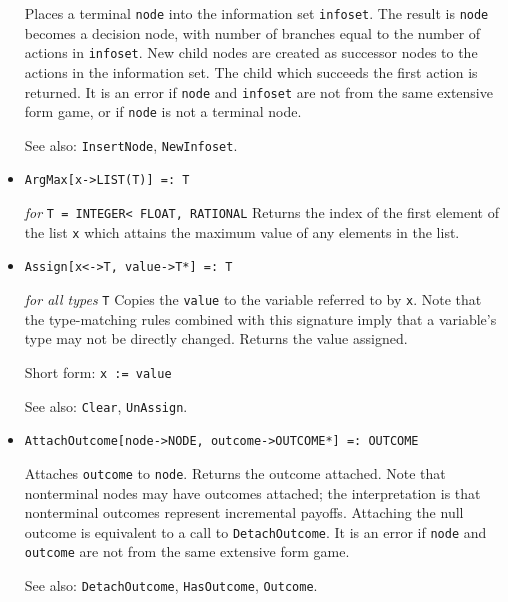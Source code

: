 \begin{itemize}
\bd
Places a terminal \verb+node+ into the information set
\verb+infoset+.  The result is \verb+node+ becomes a decision node,
with number of branches equal to the number of actions in \verb+infoset+.
New child nodes are created as successor nodes to the actions in the
information set.  The child which succeeds the first action is returned.
It is an error if \verb+node+ and \verb+infoset+ are not from the same
extensive form game, or if \verb+node+ is not a terminal node.

\item [See also:] \verb+InsertNode+, \verb+NewInfoset+.
\ed



\item 
\protect \large \begin{verbatim}
ArgMax[x->LIST(T)] =: T 
\end{verbatim} \normalsize

{\it for} {\tt T = INTEGER< FLOAT, RATIONAL} 
\bd 
Returns the index of the first element of the list \verb+x+ which
attains the maximum value of any elements in the list.  
\ed

\item 
\protect \large \begin{verbatim}
Assign[x<->T, value->T*] =: T
\end{verbatim} \normalsize

{\it for all types} {\tt T}
\bd
Copies the \verb+value+ to the variable referred to by \verb+x+.
Note that the type-matching rules combined with this signature imply that
a variable's type may not be directly changed.  Returns the value assigned.
\item [Short form:] \verb+x := value+
\item [See also:] \verb+Clear+, \verb+UnAssign+.
\ed

\item
\protect \large \begin{verbatim} 
AttachOutcome[node->NODE, outcome->OUTCOME*] =: OUTCOME
\end{verbatim}\normalsize

\bd
Attaches \verb+outcome+ to \verb+node+.  Returns the outcome attached.
Note that nonterminal nodes may have outcomes attached; the interpretation
is that nonterminal outcomes represent incremental payoffs.  Attaching
the null outcome is equivalent to a call to \verb+DetachOutcome+.  It is
an error if \verb+node+ and \verb+outcome+ are not from the same
extensive form game.
\item [See also:] \verb+DetachOutcome+, \verb+HasOutcome+, \verb+Outcome+.
\ed


\end{itemize}
